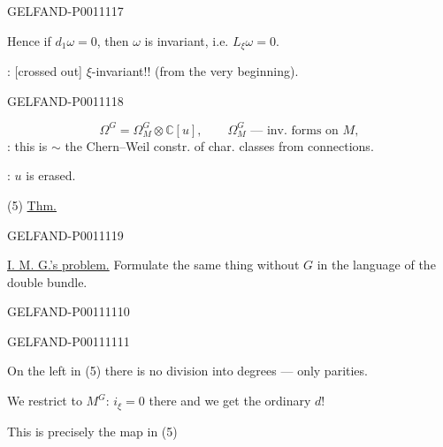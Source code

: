 \begin{GelfandAdjacentEvidence}{GELFAND-P001111}{7}


Hence if $d_1\omega=0$, then $\omega$ is invariant, i.e. $L_\xi\omega=0$.

: [crossed out] $\xi$-invariant!! (from the very beginning).
\end{GelfandAdjacentEvidence}
\begin{GelfandAdjacentEvidence}{GELFAND-P001111}{8}

\[
\Omega^G=\Omega_M^G\otimes\mathbb C[u],\qquad
\Omega_M^G\text{ — inv. forms on }M,
\]
: this is $\sim$ the Chern–Weil constr. of char. classes from connections.

: $u$ is erased.

(5) \underline{Thm.}
\end{GelfandAdjacentEvidence}
\begin{GelfandAdjacentEvidence}{GELFAND-P001111}{9}


\underline{I. M. G.’s problem.} Formulate the same thing without $G$ in the language of the double bundle.
\end{GelfandAdjacentEvidence}
\begin{GelfandAdjacentEvidence}{GELFAND-P001111}{10}


\end{GelfandAdjacentEvidence}
\begin{GelfandAdjacentEvidence}{GELFAND-P001111}{11}


On the left in (5) there is no division into degrees — only parities.

We restrict to $M^G$: $i_\xi=0$ there and we get the ordinary $d$!

This is precisely the map in (5)

\end{GelfandAdjacentEvidence}



